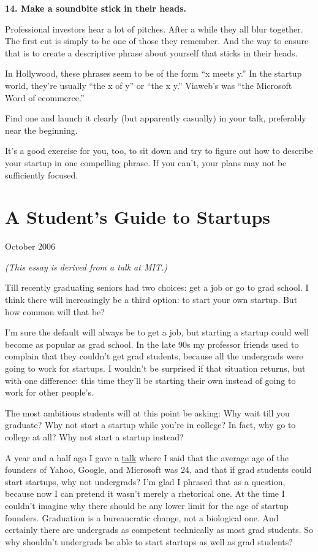 \documentclass[12pt]{book}
\begin{document}
\textbf{14. Make a soundbite stick in their heads.}

Professional investors hear a lot of pitches. After a while they all
blur together. The first cut is simply to be one of those they remember.
And the way to ensure that is to create a descriptive phrase about
yourself that sticks in their heads.

In Hollywood, these phrases seem to be of the form ``x meets y.'' In the
startup world, they're usually ``the x of y'' or ``the x y.'' Viaweb's
was ``the Microsoft Word of ecommerce.''

Find one and launch it clearly (but apparently casually) in your talk,
preferably near the beginning.

It's a good exercise for you, too, to sit down and try to figure out how
to describe your startup in one compelling phrase. If you can't, your
plans may not be sufficiently focused.
\chapter{A Student's Guide to Startups}

October 2006

\emph{(This essay is derived from a talk at MIT.)}

Till recently graduating seniors had two choices: get a job or go to
grad school. I think there will increasingly be a third option: to start
your own startup. But how common will that be?

I'm sure the default will always be to get a job, but starting a startup
could well become as popular as grad school. In the late 90s my
professor friends used to complain that they couldn't get grad students,
because all the undergrads were going to work for startups. I wouldn't
be surprised if that situation returns, but with one difference: this
time they'll be starting their own instead of going to work for other
people's.

The most ambitious students will at this point be asking: Why wait till
you graduate? Why not start a startup while you're in college? In fact,
why go to college at all? Why not start a startup instead?

A year and a half ago I gave a \href{hiring.html}{talk} where I said
that the average age of the founders of Yahoo, Google, and Microsoft was
24, and that if grad students could start startups, why not undergrads?
I'm glad I phrased that as a question, because now I can pretend it
wasn't merely a rhetorical one. At the time I couldn't imagine why there
should be any lower limit for the age of startup founders. Graduation is
a bureaucratic change, not a biological one. And certainly there are
undergrads as competent technically as most grad students. So why
shouldn't undergrads be able to start startups as well as grad students?
\end{document}

